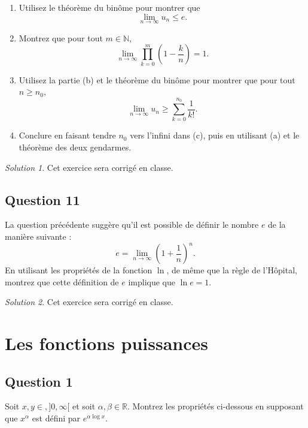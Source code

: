 \documentclass[
  12pt,
  letterpaper,
]{book}
\theoremstyle{remark}
\newtheorem*{solution}{Solution}
\begin{document}
\begin{enumerate}
\item
  Utilisez le théorème du binôme pour montrer que
  \[\lim_{n\rightarrow\infty}u_n\leq e.\]
\item
  Montrez que pour tout \(m\in\mathbb{N}\),
  \[\lim_{n\rightarrow\infty}\prod_{k=0}^{m}\left(1-\frac{k}{n}\right)=1.\]
\item
  Utilisez la partie (b) et le théorème du binôme pour montrer que pour
  tout \(n\geq n_0\),
  \[\lim_{n\rightarrow\infty}u_n\geq\sum_{k=0}^{n_0}\frac{1}{k!}.\]
\item
  Conclure en faisant tendre \(n_0\) vers l'infini dans (c), puis en
  utilisant (a) et le théorème des deux gendarmes.
\end{enumerate}

\begin{solution}

Cet exercice sera corrigé en classe.

\end{solution}

\hypertarget{question-11}{%
\section{Question 11}\label{question-11}}

La question précédente suggère qu'il est possible de définir le nombre
\(e\) de la manière suivante :
\[e=\lim_{n\rightarrow\infty}\left(1+\frac{1}{n}\right)^n.\] En
utilisant les propriétés de la fonction \(\ln\), de même que la règle de
l'Hôpital, montrez que cette définition de \(e\) implique que
\(\ln e=1\).

\begin{solution}

Cet exercice sera corrigé en classe.

\end{solution}

\hypertarget{les-fonctions-puissances-1}{%
\chapter{Les fonctions puissances}\label{les-fonctions-puissances-1}}

\hypertarget{question-1-1}{%
\section{Question 1}\label{question-1-1}}

Soit \(x,y\in,]0,\infty[\) et soit \(\alpha,\beta\in\mathbb{R}\).
Montrez les propriétés ci-dessous en supposant que \(x^{\alpha}\) est
défini par \(e^{\alpha\log x}\).
\end{document}
